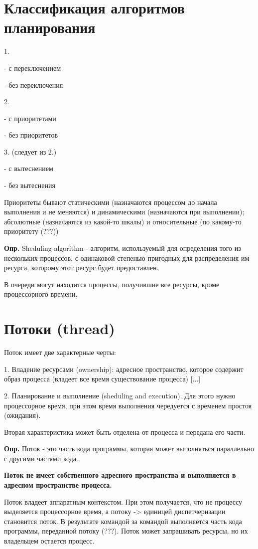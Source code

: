 \documentclass[14pt, a4paper]{article}
\begin{document}
	\section{Классификация алгоритмов планирования}
	
	1.
	
	- с переключением
	
	- без переключения
	
	2.
	
	- с приоритетами
	
	- без приоритетов
	
	3. (следует из 2.)
	
	- с вытеснением
	
	- без вытеснения
	
	Приоритеты бывают статическими (назначаются процессом до начала выполнения и не меняются) и динамическими (назначаются при выполнении); абсолютные (назначаются из какой-то шкалы) и относительные (по какому-то приоритету (???))
	
	{\bf Опр.} Sheduling algorithm - алгоритм, используемый для определения того из нескольких процессов, с одинаковой степенью пригодных для распределения им ресурса, которому этот ресурс будет предоставлен.
	
	В очереди могут находится процессы, получившие все ресурсы, кроме процессорного времени.
	
	\section{Потоки (thread)}
	
	Поток имеет две характерные черты:
	
	1. Владение ресурсами (ownership): адресное пространство, которое содержит образ процесса (владеет все время существование процесса) [...]
	
	2. Планирование и выполнение (sheduling and execution). Для этого нужно процессорное время, при этом время выполнения чередуется с временем простоя (ожидания).
	
	Вторая характеристика может быть отделена от процесса и передана его части.
	
	{\bf Опр.} Поток - это часть кода программы, которая может выполняться параллельно с другими частями кода.
	
	{\bf Поток не имеет собственного адресного пространства и выполняется в адресном пространстве процесса.}
	
	Поток владеет аппаратным контекстом. При этом получается, что не процессу выделяется процессорное время, а потоку -> единицей диспетчеризации становится поток. В результате командой за командой выполняется часть кода программы, переданной потоку (???). Поток может запрашивать ресурсы, но их владельцем остается процесс.
	
\end{document}
